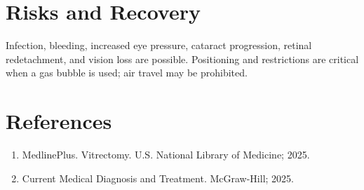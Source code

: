 \section*{Risks and Recovery}
Infection, bleeding, increased eye pressure, cataract progression, retinal redetachment, and vision loss are possible. Positioning and restrictions are critical when a gas bubble is used; air travel may be prohibited.
\section*{References}
\begin{enumerate}\item MedlinePlus. Vitrectomy. U.S. National Library of Medicine; 2025.\item Current Medical Diagnosis and Treatment. McGraw-Hill; 2025.\end{enumerate}
\clearpage
